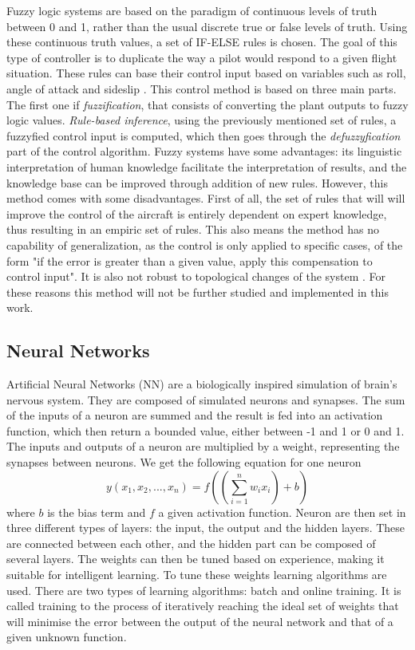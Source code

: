 Fuzzy logic systems are based on the paradigm of continuous levels of truth between 0 and 1, rather than the usual discrete true or false levels of truth. Using these continuous truth values, a set of IF-ELSE rules is chosen. The goal of this type of controller is to duplicate the way a pilot would respond to a given flight situation. These rules can base their control input based on variables such as roll, angle of attack and sideslip \cite{Comparison_IntelligentSys}. This control method is based on three main parts. The first one if \textit{fuzzification}, that consists of converting the plant outputs to fuzzy logic values. \textit{Rule-based inference}, using the previously mentioned set of rules, a fuzzyfied control input is computed, which then goes through the \textit{defuzzyfication} part of the control algorithm. 
Fuzzy systems have some advantages: its linguistic interpretation of human knowledge facilitate the interpretation of results, and the knowledge base can be improved through addition of new rules. However, this method comes with some disadvantages. First of all, the set of rules that will will improve the control of the aircraft is entirely dependent on expert knowledge, thus resulting in an empiric set of rules. This also means the method has no capability of generalization, as the control is only applied to specific cases, of the form "if the error is greater than a given value, apply this compensation to control input". It is also not robust to topological changes of the system \cite{Neuro_fuzzy_survey}. For these reasons this method will not be further studied and implemented in this work.


\subsection{Neural Networks}
\label{section:background/NN}

Artificial Neural Networks (NN) are a biologically inspired simulation of brain's nervous system. They are composed of simulated neurons and synapses. The sum of the inputs of a neuron are summed and the result is fed into an activation function, which then return a bounded value, either between -1 and 1 or 0 and 1. The inputs and outputs of a neuron are multiplied by a weight, representing the synapses between neurons. We get the following equation for one neuron
\begin{equation}
y(x_1,x_2,...,x_n)=f((\sum ^n_{i=1} w_i x_i)+b)
\end{equation}
where $b$ is the bias term and $f$ a given activation function. Neuron are then set in three different types of layers: the input, the output and the hidden layers. These are connected between each other, and the hidden part can be composed of several layers. The weights can then be tuned based on experience, making it suitable for intelligent learning. To tune these weights learning algorithms are used. There are two types of learning algorithms: batch and online training. It is called training to the process of iteratively reaching the ideal set of weights that will minimise the error between the output of the neural network and that of a given unknown function.

